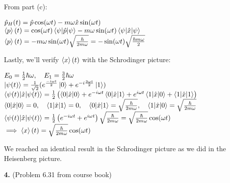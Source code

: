 \documentclass[14pt]{extarticle}
\makeatletter
\newenvironment{lefteqs}{%
    \begin{flushleft}%
    \renewcommand{\arraystretch}{1.3}%
    $\begin{array}{@{}l@{}}%
}{%
    \end{array}$%
    \end{flushleft}%
}
\makeatother
\begin{document}
From part (c):

\begin{lefteqs}
    \hat{p}_H(t) = \hat{p} \cos(\omega t) - m \omega \hat{x} \sin(\omega t) \\
    \braket{p}(t) = \cos(\omega t) \braket{\psi | \hat{p} | \psi} - m \omega \sin(\omega t) \braket{\psi | \hat{x} | \psi} \\
    \braket{p}(t) = -m\omega \sin(\omega t) \sqrt{\frac{\hbar}{2m\omega}} = -\sin(\omega t) \sqrt{\frac{\hbar m \omega}{2}} \\
\end{lefteqs}

Lastly, we'll verify $\braket{x}(t)$ with the Schrodinger picture:

\begin{lefteqs}
    E_0 = \frac{1}{2} \hbar \omega , \quad E_1 = \frac{3}{2} \hbar \omega \\
    \ket{\psi(t)} = \frac{1}{\sqrt{2}} (e^{\frac{-i\omega t}{2}} \ket{0} + e^{-i \frac{3\omega t}{2}} \ket{1}) \\
    \braket{\psi(t) | \hat{x} | \psi(t)} =  \frac{1}{2} \left( \braket{0 | \hat{x} | 0} + e^{-i \omega t} \braket{0 | \hat{x} | 1} + e^{i \omega t} \braket{1 | \hat{x} | 0} + \braket{1 | \hat{x} | 1} \right) \\
    \braket{0 | \hat{x} | 0} = 0 , \quad \braket{1 | \hat{x} | 1} = 0 , \quad \braket{0 | \hat{x} | 1} = \sqrt{\frac{\hbar}{2m\omega}} , \quad \braket{1 | \hat{x} | 0} = \sqrt{\frac{\hbar}{2m\omega}} \\
    \braket{\psi(t) | \hat{x} | \psi(t)} = \frac{1}{2} \left( e^{-i \omega t} + e^{i \omega t} \right) \sqrt{\frac{\hbar}{2m\omega}} = \sqrt{\frac{\hbar}{2m\omega}} \cos(\omega t) \\
    \implies \braket{x}(t) = \sqrt{\frac{\hbar}{2m\omega}} \cos(\omega t)
\end{lefteqs}

We reached an identical result in the Schrodinger picture as we did in the Heisenberg picture.

\newpage

\textbf{\large 4.}
(Problem 6.31 from course book)
\end{document}
